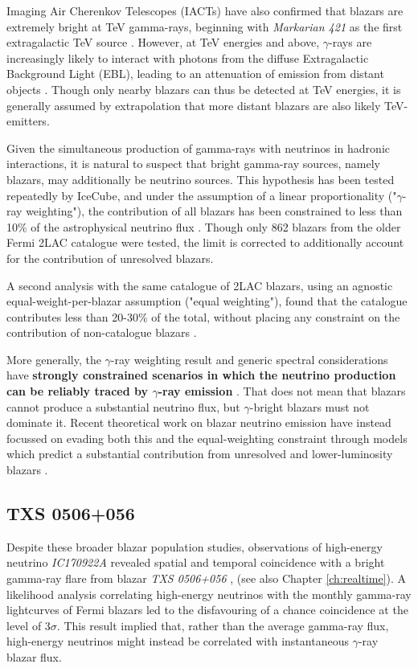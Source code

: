 Imaging Air Cherenkov Telescopes (IACTs) have also confirmed that blazars are extremely bright at TeV gamma-rays, beginning with \emph{Markarian 421} as the first extragalactic TeV source . However, at TeV energies and above, $\gamma$-rays are increasingly likely to interact with photons from the diffuse Extragalactic Background Light (EBL), leading to an attenuation of emission from distant objects . Though only nearby blazars can thus be detected at TeV energies, it is generally assumed by extrapolation that more distant blazars are also likely TeV-emitters.

Given the simultaneous production of gamma-rays with neutrinos in hadronic interactions, it is natural to suspect that bright gamma-ray sources, namely blazars, may additionally be neutrino sources. This hypothesis has been tested repeatedly by IceCube, and under the assumption of a linear proportionality ("$\gamma$-ray weighting"), the contribution of all blazars has been constrained to less than 10\% of the astrophysical neutrino flux . Though only 862 blazars from the older Fermi 2LAC catalogue were tested, the limit is corrected to additionally account for the contribution of unresolved blazars. 

A second analysis with the same catalogue of 2LAC blazars, using an agnostic equal-weight-per-blazar assumption ("equal weighting"), found that the catalogue contributes less than 20-30\% of the total, without placing any constraint on the contribution of non-catalogue blazars \cite{ic_blazar_17}. 

More generally, the $\gamma$-ray weighting result and generic spectral considerations have \textbf{strongly constrained scenarios in which the neutrino production can be reliably traced by $\gamma$-ray emission} . That does not mean that blazars cannot produce a substantial neutrino flux, but $\gamma$-bright blazars must not dominate it. Recent theoretical work on blazar neutrino emission have instead focussed on evading both this and the equal-weighting constraint through models which predict a substantial contribution from unresolved and lower-luminosity blazars .

\subsection*{TXS 0506+056}

Despite these broader blazar population studies, observations of high-energy neutrino \emph{IC170922A} revealed spatial and temporal coincidence with a bright gamma-ray flare from blazar \emph{TXS 0506+056} , (see also Chapter \ref{ch:realtime}). A likelihood analysis correlating high-energy neutrinos with the monthly gamma-ray lightcurves of Fermi blazars led to the disfavouring of a chance coincidence at the level of $3 \sigma$. This result implied that, rather than the average gamma-ray flux, high-energy neutrinos might instead be correlated with instantaneous $\gamma$-ray blazar flux. 

